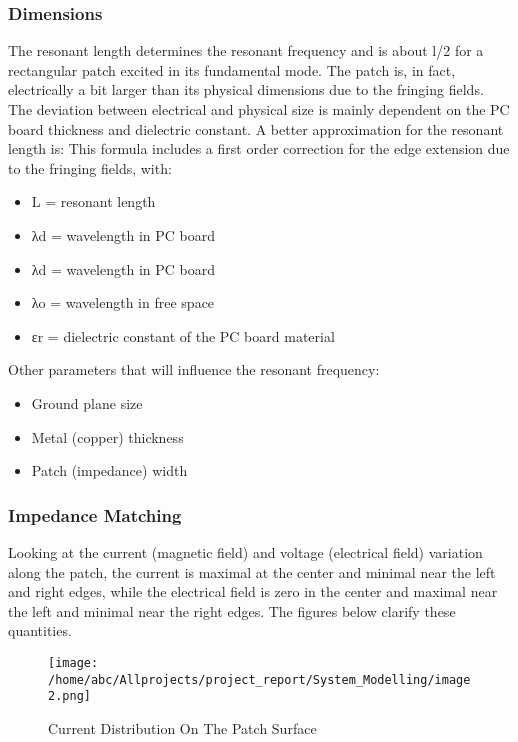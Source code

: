 \documentclass[12pt]{article}
\begin{document}
  \subsubsection{Dimensions}\label{sub:Dimensions}
	   \justify
	    The resonant length determines the resonant frequency and is about l/2 for a rectangular patch excited in its fundamental mode. The patch is, in fact, electrically a bit larger than its physical dimensions due to the fringing fields. The deviation between electrical and physical size is mainly dependent on the PC board thickness and dielectric constant.
	    A better approximation for the resonant length is:
	   \justify
	    This formula includes a first order correction for the edge extension due to the fringing fields, with:
	     \begin{itemize}
	       \item   L = resonant length
	       \item   λd = wavelength in PC board
	       \item λd = wavelength in PC board
	       \item λo = wavelength in free space
	       \item εr = dielectric constant of the PC board material
	
	     \end{itemize}
	
	     Other parameters that will influence the resonant frequency:
	
	     \begin{itemize}
	       \item Ground plane size
	       \item Metal (copper) thickness
	       \item  Patch (impedance) width
	     \end{itemize}

    \subsubsection{Impedance Matching}\label{sub:Impedance Matching}
     \justify
      Looking at the current (magnetic field) and voltage (electrical field) variation along the  patch, the current is maximal at the center and minimal near the left and right edges, while the electrical field is zero in the center and maximal near the left and minimal near the right edges.  The figures below clarify these quantities.

         \begin{figure}[h]
         	\centering
	         	\texttt{[image: /home/abc/Allprojects/project\_report/System\_Modelling/image2.png]}
	         	\caption{Current Distribution On The Patch Surface}
         \end{figure}
         
\end{document}

